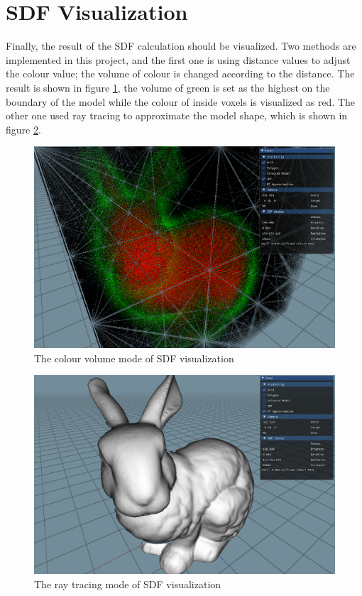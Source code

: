 \clearpage

\section{SDF Visualization}
\label{impl:sdfvisual}

Finally, the result of the SDF calculation should be visualized. Two methods are implemented in this project, and the first one is using distance values to adjust the colour value; the volume of colour is changed according to the distance. The result is shown in figure \ref{impl:sdfiso},  the volume of green is set as the highest on the boundary of the model while the colour of inside voxels is visualized as red. The other one used ray tracing to approximate the model shape, which is shown in figure \ref{impl:sdfrt}.

\begin{figure}[htbp]
    \centering
    \includegraphics[width=12.6cm]{Images/Chap4/result.png}
    \caption{The colour volume mode of SDF visualization}
    \label{impl:sdfiso}
\end{figure}
\begin{figure}[htbp]
    \centering
    \includegraphics[width=12.6cm]{Images/Chap4/rta.png}
    \caption{The ray tracing mode of SDF visualization}
    \label{impl:sdfrt}
\end{figure}


\clearpage